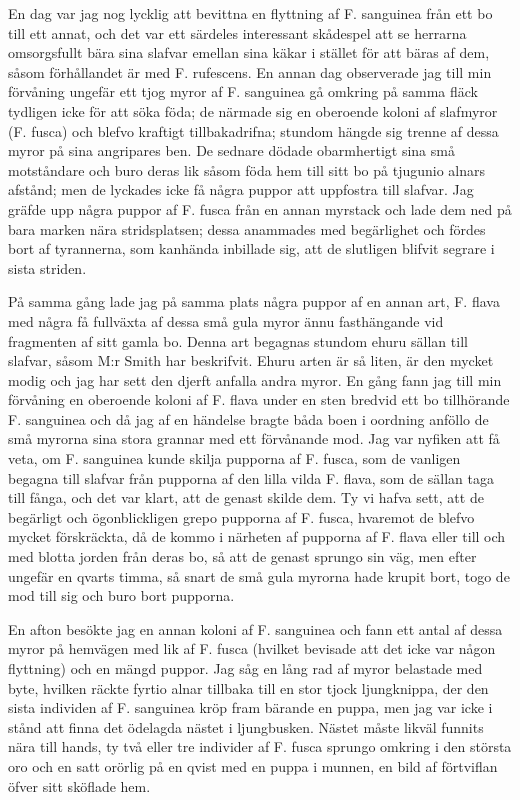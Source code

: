 En dag var jag nog lycklig att bevittna en flyttning af F. sanguinea från ett bo till ett annat, och det var ett särdeles interessant skådespel att se herrarna omsorgsfullt bära sina slafvar emellan sina käkar i stället för att bäras af dem, såsom förhållandet är med F. rufescens. En annan dag observerade jag till min förvåning ungefär ett tjog myror af F. sanguinea gå omkring på samma fläck tydligen icke för att söka föda; de närmade sig en oberoende koloni af slafmyror (F. fusca) och blefvo kraftigt tillbakadrifna; stundom hängde sig trenne af dessa myror på sina angripares ben. De sednare dödade obarmhertigt sina små motståndare och buro deras lik såsom föda hem till sitt bo på tjugunio alnars afstånd; men de lyckades icke få några puppor att uppfostra till slafvar. Jag gräfde upp några puppor af F. fusca från en annan myrstack och lade dem ned på bara marken nära stridsplatsen; dessa anammades med begärlighet och fördes bort af tyrannerna, som kanhända inbillade sig, att de slutligen blifvit segrare i sista striden.

På samma gång lade jag på samma plats några puppor af en annan art, F. flava med några få fullväxta af dessa små gula myror ännu fasthängande vid fragmenten af sitt gamla bo. Denna art begagnas stundom ehuru sällan till slafvar, såsom M:r Smith har beskrifvit. Ehuru arten är så liten, är den mycket modig och jag har sett den djerft anfalla andra myror. En gång fann jag till min förvåning en oberoende koloni af F. flava under en sten bredvid ett bo tillhörande F. sanguinea och då jag af en händelse bragte båda boen i oordning anföllo de små myrorna sina stora grannar med ett förvånande mod. Jag var nyfiken att få veta, om F. sanguinea kunde skilja pupporna af F. fusca, som de vanligen begagna till slafvar från pupporna af den lilla vilda F. flava, som de sällan taga till fånga, och det var klart, att de genast skilde dem. Ty vi hafva sett, att de begärligt och ögonblickligen grepo pupporna af F. fusca, hvaremot de blefvo mycket förskräckta, då de kommo i närheten af pupporna af F. flava eller till och med blotta jorden från deras bo, så att de genast sprungo sin väg, men efter ungefär en qvarts timma, så snart de små gula myrorna hade krupit bort, togo de mod till sig och buro bort pupporna.

En afton besökte jag en annan koloni af F. sanguinea och fann ett antal af dessa myror på hemvägen med lik af F. fusca (hvilket bevisade att det icke var någon flyttning) och en mängd puppor. Jag såg en lång rad af myror belastade med byte, hvilken räckte fyrtio alnar tillbaka till en stor tjock ljungknippa, der den sista individen af F. sanguinea kröp fram bärande en puppa, men jag var icke i stånd att finna det ödelagda nästet i ljungbusken. Nästet måste likväl funnits nära till hands, ty två eller tre individer af F. fusca sprungo omkring i den största oro och en satt orörlig på en qvist med en puppa i munnen, en bild af förtviflan öfver sitt sköflade hem.

